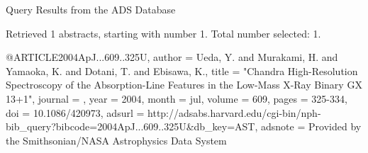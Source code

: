 Query Results from the ADS Database


Retrieved 1 abstracts, starting with number 1.  Total number selected: 1.

@ARTICLE{2004ApJ...609..325U,
   author = {{Ueda}, Y. and {Murakami}, H. and {Yamaoka}, K. and {Dotani}, T. and 
	{Ebisawa}, K.},
    title = "{Chandra High-Resolution Spectroscopy of the Absorption-Line Features in the Low-Mass X-Ray Binary GX 13+1}",
  journal = {\apj},
     year = 2004,
    month = jul,
   volume = 609,
    pages = {325-334},
      doi = {10.1086/420973},
   adsurl = {http://adsabs.harvard.edu/cgi-bin/nph-bib_query?bibcode=2004ApJ...609..325U&db_key=AST},
  adsnote = {Provided by the Smithsonian/NASA Astrophysics Data System}
}



